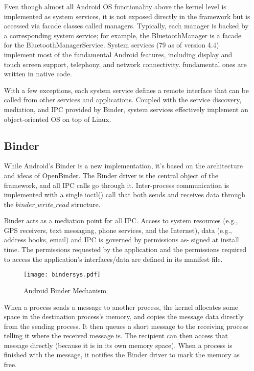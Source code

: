 Even though almost all Android OS functionality above the kernel level is implemented as system services, it is not exposed directly in the framework but is accessed via facade classes called managers. Typically, each manager is backed by a corresponding system service; for example, the BluetoothManager is a facade for the BluetoothManagerService.  System services (79 as of version 4.4) implement most of the fundamental Android features, including display and touch screen support, telephony, and network connectivity. fundamental ones are written in native code.

With a few exceptions, each system service defines a remote interface that can be called from other services and applications. Coupled with the service discovery, mediation, and IPC provided by Binder, system services effectively implement an object-oriented OS on top of Linux.

\subsection{Binder}

While Android’s Binder is a new implementation, it’s based on the architecture and ideas of OpenBinder.
The Binder driver is the central object of the framework, and all IPC calls
go through it. Inter-process communication is implemented with a single ioctl() call that both sends and receives data through the $binder\_write\_read$ structure.

Binder acts as a mediation point for all IPC. Access to system resources (e.g., GPS receivers, text messaging, phone services, and the Internet), data (e.g., address books, email) and IPC is governed by permissions as- signed at install time. The permissions requested by the application and the permissions required to access the application’s interfaces/data are defined in its manifest file.

\begin{figure}[H]
\centering
\texttt{[image: bindersys.pdf]}
\caption{Android Binder Mechanism}
\label{fig:androidmodel}
\end{figure}

When a process sends a message to another process, the kernel allocates some space in the destination process’s memory, and copies the message data directly from the sending process. It then queues a short message to the receiving process telling it where the received message is. The recipient can then access that message directly (because it is in its own memory space). When a process is  finished with the message, it notifies the Binder driver to mark the memory as free.

